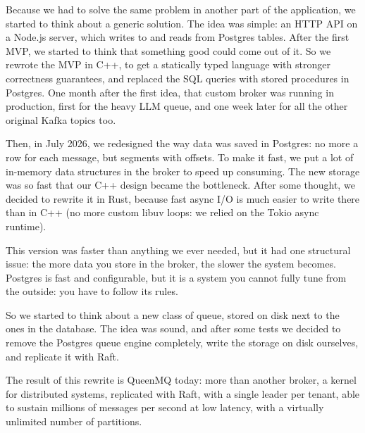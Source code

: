 Because we had to solve the same problem in another part of the application, we started to think
about a generic solution. The idea was simple: an HTTP API on a Node.js server, which writes to and
reads from Postgres tables. After the first MVP, we started to think that something good could come
out of it. So we rewrote the MVP in C++, to get a statically typed language with stronger
correctness guarantees, and replaced the SQL queries with stored procedures in Postgres. One month
after the first idea, that custom broker was running in production, first for the heavy LLM queue,
and one week later for all the other original Kafka topics too.

Then, in July 2026, we redesigned the way data was saved in Postgres: no more a row for each
message, but segments with offsets. To make it fast, we put a lot of in-memory data structures in
the broker to speed up consuming. The new storage was so fast that our C++ design became the
bottleneck. After some thought, we decided to rewrite it in Rust, because fast async I/O is much
easier to write there than in C++ (no more custom libuv loops: we relied on the Tokio async
runtime).

This version was faster than anything we ever needed, but it had one structural issue: the more
data you store in the broker, the slower the system becomes. Postgres is fast and configurable, but
it is a system you cannot fully tune from the outside: you have to follow its rules.

So we started to think about a new class of queue, stored on disk next to the ones in the
database. The idea was sound, and after some tests we decided to remove the Postgres queue engine
completely, write the storage on disk ourselves, and replicate it with Raft.

The result of this rewrite is QueenMQ today: more than another broker, a kernel for distributed
systems, replicated with Raft, with a single leader per tenant, able to sustain millions of messages per second at low latency, with a
virtually unlimited number of partitions.
